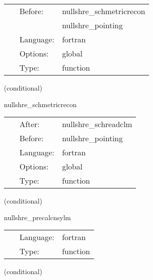  \begin{tabular*}{160mm}{cll} 
~ & Before:  & nullshre\_schmetricrecon \\ 
~& ~ &nullshre\_pointing\\ 
~ & Language:  & fortran \\ 
~ & Options:  & global \\ 
~ & Type:  & function \\ 
\end{tabular*} 


\vspace{5mm}

   (conditional) 

\hspace{5mm} nullshre\_schmetricrecon 

\hspace{5mm}{\it current schwarzchild metric and its derivatives on the sphere } 


\hspace{5mm}

 \begin{tabular*}{160mm}{cll} 
~ & After:  & nullshre\_schreadclm \\ 
~ & Before:  & nullshre\_pointing \\ 
~ & Language:  & fortran \\ 
~ & Options:  & global \\ 
~ & Type:  & function \\ 
\end{tabular*} 


\vspace{5mm}

   (conditional) 

\hspace{5mm} nullshre\_precalcnsylm 

\hspace{5mm}{\it precalculate spherical harmonics in (p,q) coordinates } 


\hspace{5mm}

 \begin{tabular*}{160mm}{cll} 
~ & Language:  & fortran \\ 
~ & Type:  & function \\ 
\end{tabular*} 


\vspace{5mm}

   (conditional) 

